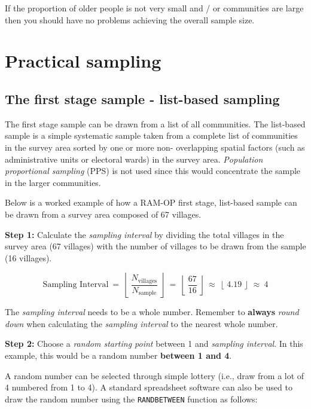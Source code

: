 \documentclass[12pt,a4paper]{book}
\theoremstyle{definition}
\theoremstyle{definition}
\theoremstyle{definition}
\theoremstyle{remark}
\begin{document}
If the proportion of older people is not very small and / or communities
are large then you should have no problems achieving the overall sample
size.

\hypertarget{practical-sampling}{%
\section{Practical sampling}\label{practical-sampling}}

\hypertarget{the-first-stage-sample---list-based-sampling}{%
\subsection{The first stage sample - list-based
sampling}\label{the-first-stage-sample---list-based-sampling}}

The first stage sample can be drawn from a list of all communities. The
list-based sample is a simple systematic sample taken from a complete
list of communities in the survey area sorted by one or more non-
overlapping spatial factors (such as administrative units or electoral
wards) in the survey area. \emph{Population proportional sampling} (PPS)
is not used since this would concentrate the sample in the larger
communities.

Below is a worked example of how a RAM-OP first stage, list-based sample
can be drawn from a survey area composed of 67 villages.

\textbf{Step 1:} Calculate the \emph{sampling interval} by dividing the
total villages in the survey area (67 villages) with the number of
villages to be drawn from the sample (16 villages).

\[\text{Sampling Interval} ~ = ~ \left \lfloor ~ \frac{N_{\text{villages}}}{N_{\text{sample}}} ~ \right \rfloor ~ = ~ \left \lfloor ~ \frac{67}{16} ~ \right \rfloor ~ \approx ~ \left \lfloor ~ 4.19 ~ \right \rfloor ~ \approx ~ 4\]

The \emph{sampling interval} needs to be a whole number. Remember to
\textbf{always} \emph{round down} when calculating the \emph{sampling
interval} to the nearest whole number.

\textbf{Step 2:} Choose a \emph{random starting point} between 1 and
\emph{sampling interval}. In this example, this would be a random number
\textbf{between 1 and 4}.

A random number can be selected through simple lottery (i.e., draw from
a lot of 4 numbered from 1 to 4). A standard spreadsheet software can
also be used to draw the random number using the \texttt{RANDBETWEEN}
function as follows:
\end{document}
